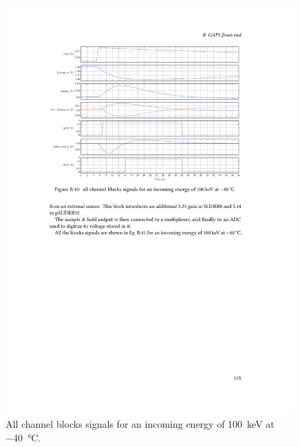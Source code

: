\begin{figure}[h!]
    \centering
    \includegraphics[width=0.99\textwidth]{Images/appendGAPSintro/ASIC_riassunto_segnali.pdf}
    \caption{All channel blocks signals for an incoming energy of \SI{100}{\kilo\electronvolt} at \SI{-40}{\celsius}.}
    \label{figASICsignals}
\end{figure}
